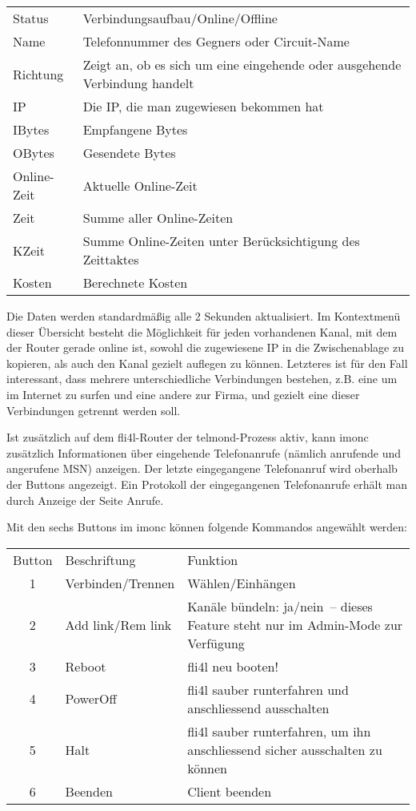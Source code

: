   \begin{tabular}{lp{9cm}}
    Status             &Verbindungsaufbau/Online/Offline\\
    Name               &Telefonnummer des Gegners oder Circuit-Name\\
    Richtung           &Zeigt an, ob es sich um eine eingehende oder ausgehende
    Verbindung handelt\\
    IP                 &Die IP, die man zugewiesen bekommen hat\\
    IBytes             &Empfangene Bytes\\
    OBytes             &Gesendete Bytes\\
    Online-Zeit        &Aktuelle Online-Zeit\\
    Zeit               &Summe aller Online-Zeiten\\
    KZeit              &Summe Online-Zeiten unter Berücksichtigung des Zeittaktes\\
    Kosten             &Berechnete Kosten\\
  \end{tabular}

  \medskip

  Die Daten werden standardmäßig alle 2 Sekunden aktualisiert. Im Kontextmenü
  dieser Übersicht besteht die Möglichkeit für jeden vorhandenen Kanal, mit dem 
  der Router gerade online ist, sowohl die zugewiesene IP in die Zwischenablage 
  zu kopieren, als auch den Kanal gezielt auflegen zu können. Letzteres ist für 
  den Fall interessant, dass mehrere unterschiedliche Verbindungen bestehen, 
  z.B. eine um im Internet zu surfen und eine andere zur Firma, und gezielt eine 
  dieser Verbindungen getrennt werden soll.

  Ist zusätzlich auf dem fli4l-Router der telmond-Prozess aktiv, kann imonc 
  zusätzlich Informationen über eingehende Telefonanrufe (nämlich anrufende und 
  angerufene MSN) anzeigen. Der letzte eingegangene Telefonanruf wird oberhalb 
  der Buttons angezeigt.   Ein Protokoll der eingegangenen Telefonanrufe erhält 
  man durch Anzeige der Seite Anrufe.

  Mit den sechs Buttons im imonc können folgende Kommandos angewählt werden:

  \begin{tabular}{clp{9cm}}
    Button & Beschriftung & Funktion \\
    1& Verbinden/Trennen  & Wählen/Einhängen\\
    2& Add link/Rem link  & Kanäle bündeln: ja/nein~-- dieses Feature steht nur
                            im Admin-Mode zur Verfügung\\
    3& Reboot             & fli4l neu booten!\\
    4& PowerOff           & fli4l sauber runterfahren und anschliessend
                            ausschalten\\
    5& Halt               & fli4l sauber runterfahren, um ihn anschliessend
                            sicher ausschalten zu können\\
    6& Beenden            & Client beenden\\
  \end{tabular}

